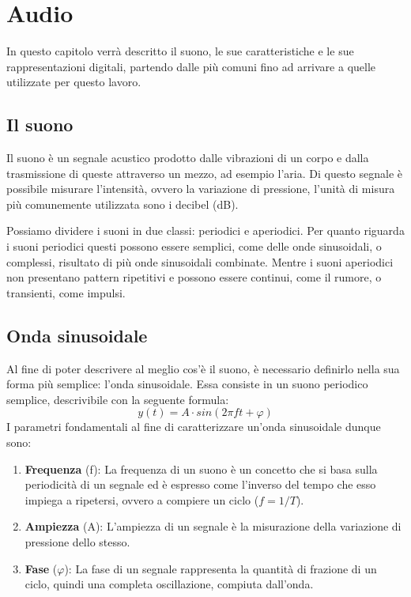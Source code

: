 \chapter{Audio}
		In questo capitolo verrà descritto il suono, le sue caratteristiche e le sue rappresentazioni digitali, partendo dalle più comuni fino ad arrivare a quelle utilizzate per questo lavoro.
		
		\section{Il suono}
			Il suono è un segnale acustico prodotto dalle vibrazioni di un corpo e dalla trasmissione di queste attraverso un mezzo, ad esempio l’aria. Di questo segnale è possibile misurare l’intensità, ovvero la variazione di pressione, l'unità di misura più comunemente utilizzata sono i decibel (dB).
			
			Possiamo dividere i suoni in due classi: periodici e aperiodici.
			Per quanto riguarda i suoni periodici questi possono essere semplici, come delle onde sinusoidali, o complessi, risultato di più onde sinusoidali combinate.
			Mentre i suoni aperiodici non presentano pattern ripetitivi e possono essere continui, come il rumore, o transienti, come impulsi.
			
		\section{Onda sinusoidale}
			Al fine di poter descrivere al meglio cos'è il suono, è necessario definirlo nella sua forma più semplice: l'onda sinusoidale. Essa consiste in un suono periodico semplice, descrivibile con la seguente formula:
			\begin{equation}
				y(t) = A \cdot sin(2 \pi ft + \varphi)
			\end{equation}
			I parametri fondamentali al fine di caratterizzare un'onda sinusoidale dunque sono:
			\begin{enumerate}
				\item \textbf{Frequenza} (f): La frequenza di un suono è un concetto che si basa sulla periodicità di un segnale ed è espresso come l'inverso del tempo che esso impiega a ripetersi, ovvero a compiere un ciclo ($f=1/T$).
				\item \textbf{Ampiezza} (A): L'ampiezza di un segnale è la misurazione della variazione di pressione dello stesso.
				\item \textbf{Fase} ($\varphi$): La fase di un segnale rappresenta la quantità di frazione di un ciclo, quindi una completa oscillazione, compiuta dall'onda.
			\end{enumerate}
			
